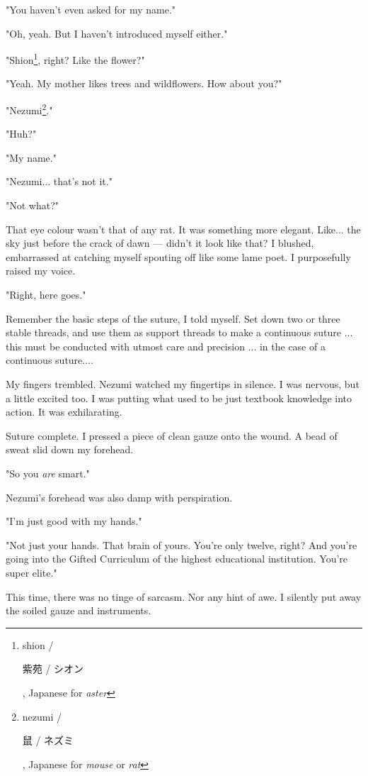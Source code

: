 "You haven't even asked for my name."

"Oh, yeah. But I haven't introduced myself either."

"Shion\footnote{shion / \begin{CJK}{UTF8}{min}紫苑 / シオン\end{CJK}, Japanese for \emph{aster}}, right? Like the flower?"

"Yeah. My mother likes trees and wildflowers. How about you?"

"Nezumi\footnote{nezumi / \begin{CJK}{UTF8}{min}鼠 / ネズミ\end{CJK}, Japanese for \emph{mouse} or \emph{rat}}."

"Huh?"

"My name."

"Nezumi... that's not it."

"Not what?"

That eye colour wasn't that of any rat. It was something more elegant.
Like... the sky just before the crack of dawn --- didn't it look like
that? I blushed, embarrassed at catching myself spouting off like some
lame poet. I purposefully raised my voice.

"Right, here goes."

Remember the basic steps of the suture, I told myself. Set down two or
three stable threads, and use them as support threads to make a
continuous suture ... this must be conducted with utmost care and
precision ... in the case of a continuous suture....

My fingers trembled. Nezumi watched my fingertips in silence. I was
nervous, but a little excited too. I was putting what used to be just
textbook knowledge into action. It was exhilarating.

Suture complete. I pressed a piece of clean gauze onto the wound. A bead
of sweat slid down my forehead.

"So you \emph{are} smart."

Nezumi's forehead was also damp with perspiration.

"I'm just good with my hands."

"Not just your hands. That brain of yours. You're only twelve, right?
And you're going into the Gifted Curriculum of the highest educational
institution. You're super elite."

This time, there was no tinge of sarcasm. Nor any hint of awe. I
silently put away the soiled gauze and instruments.~

